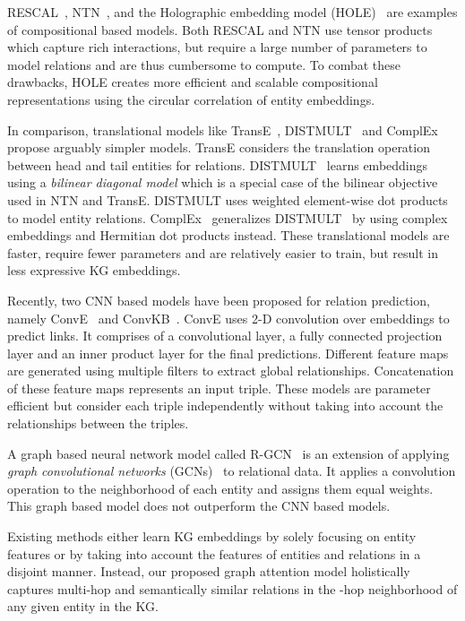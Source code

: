\documentclass[11pt,a4paper]{article}
\begin{document}
RESCAL~\cite{Nickel2011}, NTN~\cite{socher2013reasoning}, and the Holographic embedding
model (HOLE)~\cite{nickel2016holographic} are examples of compositional based models. 
Both RESCAL and NTN use tensor products which capture rich interactions, but 
require a large number of parameters to model relations and are thus cumbersome to compute. 
To combat these drawbacks, HOLE creates more efficient and scalable 
compositional representations using the circular correlation of entity embeddings.



In comparison, translational models like TransE~\cite{NIPS2013_5071}, DISTMULT~\cite{yang2014} and ComplEx~\cite{trouillon2016complex} propose arguably simpler models. 
TransE considers the translation operation between head and tail entities for relations. 
DISTMULT~\cite{yang2014} learns embeddings using a \emph{bilinear diagonal model} which is a special case of the bilinear objective used in NTN and TransE. DISTMULT uses weighted element-wise dot products to model entity relations.
ComplEx~\cite{trouillon2016complex} generalizes DISTMULT~\cite{yang2014} by using complex  
embeddings and Hermitian dot products instead. 
These translational models are faster, require fewer parameters and are relatively easier to train, but 
result in less expressive KG embeddings.

Recently, two CNN based models have been proposed for relation prediction, namely ConvE~\cite{dettmers2018convolutional} and ConvKB~\cite{nguyen2018novel}. 
ConvE uses 2-D convolution over embeddings to
predict links. It comprises of a convolutional layer, a fully connected projection layer and an inner product layer for the final predictions. 
Different feature maps are generated using multiple filters to extract global relationships.
Concatenation of these feature maps represents an input triple. These models are parameter efficient but 
consider each triple independently without taking into account the relationships between the triples.

A graph based neural network model called R-GCN~\cite{schlichtkrull2018modeling} is an extension of applying \emph{graph convolutional networks} (GCNs)~\cite{kipf2017semi} to relational data. 
It applies a convolution operation to the neighborhood of each entity and assigns them equal weights. 
This graph based model does not outperform the CNN based models.

Existing methods either learn KG embeddings by solely focusing on entity features or by taking into account the features of entities and relations in a disjoint manner. Instead, our proposed graph attention model holistically captures multi-hop and semantically similar relations in the -hop neighborhood of any given entity in the KG.
\end{document}
